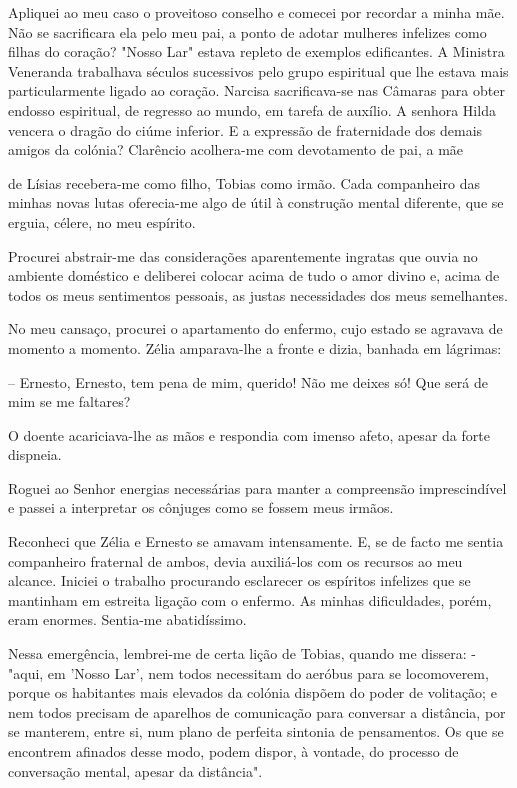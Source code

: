 \documentclass[portuguese,12pt,a4paper]{scrbook}
\begin{document}
	Apliquei ao meu caso o proveitoso conselho e comecei por recordar a minha mãe. Não se sacrificara ela pelo meu pai, a ponto de adotar mulheres infelizes como filhas do coração? "Nosso Lar" estava repleto de exemplos edificantes. A Ministra Veneranda trabalhava séculos sucessivos pelo grupo espiritual que lhe estava mais particularmente ligado ao coração. Narcisa sacrificava-se nas Câmaras para obter endosso espiritual, de regresso ao mundo, em tarefa de auxílio. A senhora Hilda vencera o dragão do ciúme inferior. E a expressão de fraternidade dos demais amigos da colónia? Clarêncio acolhera-me com devotamento de pai, a mãe
	
	
	de Lísias recebera-me como filho, Tobias como irmão. Cada companheiro das minhas novas lutas oferecia-me algo de útil à construção mental diferente, que se erguia, célere, no meu espírito.
	
	Procurei abstrair-me das considerações aparentemente ingratas que ouvia no ambiente doméstico e deliberei colocar acima de tudo o amor divino e, acima de todos os meus sentimentos pessoais, as justas necessidades dos meus semelhantes.
	
	No meu cansaço, procurei o apartamento do enfermo, cujo estado se agravava de momento a momento. Zélia amparava-lhe a fronte e dizia, banhada em lágrimas:
	
	– Ernesto, Ernesto, tem pena de mim, querido! Não me deixes só! Que será de mim se me faltares?
	
	O doente acariciava-lhe as mãos e respondia com imenso afeto, apesar da forte dispneia.
	
	Roguei ao Senhor energias necessárias para manter a compreensão imprescindível e passei a interpretar os cônjuges como se fossem meus irmãos.
	
	Reconheci que Zélia e Ernesto se amavam intensamente. E, se de facto me sentia companheiro fraternal de ambos, devia auxiliá-los com os recursos ao meu alcance. Iniciei o trabalho procurando esclarecer os espíritos infelizes que se mantinham em estreita ligação com o enfermo. As minhas dificuldades, porém, eram enormes. Sentia-me abatidíssimo.
	
	Nessa emergência, lembrei-me de certa lição de Tobias, quando me dissera: - "aqui, em 'Nosso Lar', nem todos necessitam do aeróbus para se locomoverem, porque os habitantes mais elevados da colónia dispõem do poder de volitação; e nem todos precisam de aparelhos de comunicação para conversar a distância, por se manterem, entre si, num plano de perfeita sintonia de pensamentos. Os que se encontrem afinados desse modo, podem dispor, à vontade, do processo de conversação mental, apesar da distância".
	
\end{document}
